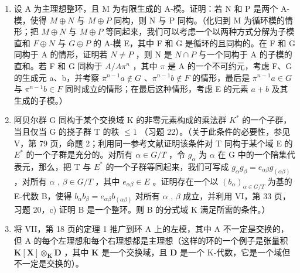 \begin{enumerate}
\def\labelenumi{\arabic{enumi})}
\setcounter{enumi}{22}
\item
  设 A 为主理想整环，且 M 为有限生成的 A-模。证明：若 N 和 P 是两个 A-模，使得 \(M \oplus N\) 与 \(M \oplus P\) 同构，则 N 与 P 同构。（化归到 M 为循环模的情形；把 \(M \oplus N\) 与 \(M \oplus P\) 等同起来，我们可以考虑一个以两种方式分解为子模直和 \(F \oplus N\) 与 \(G \oplus P\) 的 A-模 E，其中 F 和 G 是循环的且同构的。在 F 和 G 同构于 A 的情形，证明若 \(N \neq P\) ，则 N 是 \(N \cap P\) 与一个同构于 A 的子模的直和。若 F 和 G 同构于 \(A/A\pi^{n}\) ，其中 \(\pi\) 是 A 的一个不可约元，考虑 F、G 的生成元 a、b，并考察 \(\pi^{n-1}a \notin G\) 、\(\pi^{n-1}b \notin F\) 的情形，最后是 \(\pi^{n-1}a \in G\) 与 \(\pi^{n-1}b \in F\) 同时成立的情形；在最后这种情形，考虑 E 的元素 \(a + b\) 及其生成的子模。）
\item
  阿贝尔群 G 同构于某个交换域 K 的非零元素构成的乘法群 \(K^{*}\) 的一个子群，当且仅当 G 的挠子群 T 的秩 \(\leqslant 1\) （习题 22）。（关于此条件的必要性，参见 V，第 79 页，命题 2；利用同一参考文献证明该条件对 T 同构于某个域 E 的 \(E^{*}\) 的一个子群是充分的。对所有 \(\alpha \in G/T\) ，令 \(g_{\alpha}\) 为 \(\alpha\) 在 G 中的一个陪集代表元，那么，把 T 与 \(E^{*}\) 的一个子群等同起来，我们可写成 \(g_{\alpha}g_{\beta} = e_{\alpha\beta}g_{(\alpha\beta)}\) ，对所有 \(\alpha\) , \(\beta \in G/T\) ，其中 \(e_{\alpha\beta} \in E\) 。证明存在一个以 \((b_{\alpha})_{\alpha \in G/T}\) 为基的 E-代数 B，使得 \(b_{\alpha}b_{\beta} = e_{\alpha\beta}b_{(\alpha\beta)}\) 对所有 \(\alpha\) , \(\beta\) 成立，并利用 VI，第 33 页，习题 20，c) 证明 B 是一个整环。则 B 的分式域 K 满足所需的条件。）
\item
  将 VII，第 18 页的定理 1 推广到环 A 上的左模，其中 A 不一定是交换的，但 A 的每个左理想和每个右理想都是主理想（这样的环的一个例子是张量积 \(\mathbf{K}[\mathbf{X}] \otimes_{\mathbf{K}} \mathbf{D}\) ，其中 \(\mathbf{K}\) 是一个交换域，且 \(\mathbf{D}\) 是一个 K-代数，它是一个域但不一定是交换的）。
\end{enumerate}

